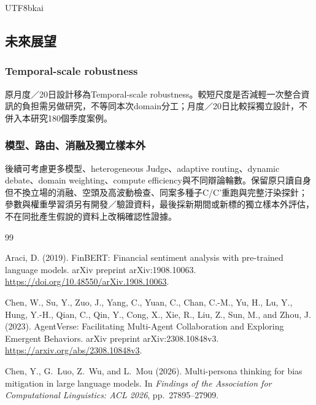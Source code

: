 \documentclass[12pt,a4paper]{article}
\begin{document}
\begin{CJK}{UTF8}{bkai}
\subsection{未來展望}

\subsubsection{Temporal-scale robustness}

原月度／20日設計移為Temporal-scale robustness。較短尺度是否減輕一次整合資訊的負担需另做研究，不等同本次domain分工；月度／20日比較採獨立設計，不併入本研究180個季度案例。

\subsubsection{模型、路由、消融及獨立樣本外}

後續可考慮更多模型、heterogeneous Judge、adaptive routing、dynamic debate、domain weighting、compute efficiency與不同辯論輪數。保留原只讀自身但不換立場的消融、空頭及高波動檢查、同案多種子C/C'重跑與完整汙染探針；參數與權重學習須另有開發／驗證資料，最後採新期間或新標的獨立樣本外評估，不在同批產生假說的資料上改稱確認性證據。

\clearpage
\setcounter{section}{7}
\renewcommand{\refname}{七、參考文獻}
\begin{thebibliography}{99}

Araci, D. (2019).
\newblock FinBERT: Financial sentiment analysis with pre-trained language
  models.
\newblock arXiv preprint arXiv:1908.10063.
\newblock \url{https://doi.org/10.48550/arXiv.1908.10063}.

Chen, W., Su, Y., Zuo, J., Yang, C., Yuan, C., Chan, C.-M., Yu, H., Lu, Y., Hung, Y.-H., Qian, C., Qin, Y., Cong, X., Xie, R., Liu, Z., Sun, M., and Zhou, J. (2023).
\newblock AgentVerse: Facilitating Multi-Agent Collaboration and Exploring Emergent Behaviors.
\newblock arXiv preprint arXiv:2308.10848v3.
\newblock \url{https://arxiv.org/abs/2308.10848v3}.

Chen, Y., G.~Luo, Z.~Wu, and L.~Mou (2026).
\newblock Multi-persona thinking for bias mitigation in large language models.
\newblock In {\em Findings of the Association for Computational Linguistics:
  ACL 2026}, pp.\  27895--27909.


\end{thebibliography}
\end{CJK}
\end{document}
